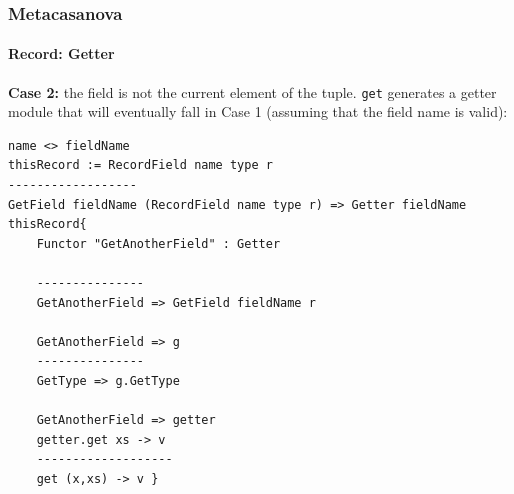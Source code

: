 \documentclass[10pt,a4paper]{beamer}
\begin{document}
\begin{frame}[fragile]
\frametitle{Metacasanova}
\framesubtitle{Record: Getter}

\textbf{Case 2:} the field is not the current element of the tuple. \texttt{get} generates a getter module that will eventually fall in Case 1 (assuming that the field name is valid):
\begin{lstlisting}
name <> fieldName
thisRecord := RecordField name type r
------------------
GetField fieldName (RecordField name type r) => Getter fieldName thisRecord{
	Functor "GetAnotherField" : Getter
	
	---------------
	GetAnotherField => GetField fieldName r
	
	GetAnotherField => g
	---------------
	GetType => g.GetType
	
	GetAnotherField => getter
	getter.get xs -> v
	-------------------
	get (x,xs) -> v }
\end{lstlisting}
\end{frame}
\end{document}
